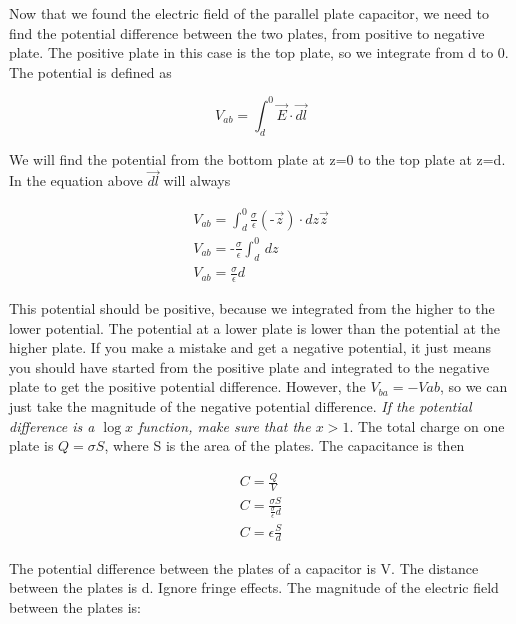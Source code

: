 \documentclass{ximera}
\begin{document}
Now that we found the electric field of the parallel plate capacitor, we need to find the potential difference between the two plates, from positive to negative plate. The positive plate in this case is the top plate, so we integrate from d to 0. The potential is defined as

\begin{equation}
V_{ab}= \int_d^0 \vec{E} \cdot \vec{dl}
\end{equation}


We will find the potential from the bottom plate at z=0 to the top plate at z=d. In the equation above $\vec{dl}$ will always

\begin{eqnarray}
V_{ab}= \int_d^0   \frac{\sigma}{ \epsilon } (\text{-} \vec{z}) \cdot dz \vec{z} \\
V_{ab}= \text{-} \frac{\sigma}{ \epsilon } \int_d^0     \, dz \\
V_{ab}=\frac{\sigma}{ \epsilon } d
\end{eqnarray}

This potential should be positive, because we integrated from the higher to the lower potential. The potential at a lower plate is lower than the potential at the higher plate. If you make a mistake and get a negative potential, it just means you should have started from the positive plate and integrated to the negative plate to get the positive potential difference. However, the $V_{ba}=-V{ab}$, so we can just take the magnitude of the negative potential difference. {\it If the potential difference is a $\log x$ function, make sure that the $x>1$}. The total charge on one plate is $Q=\sigma S$, where S is the area of the plates. The capacitance is then


\begin{eqnarray}
C=\frac{Q}{V} \\
C=\frac{\sigma S}{\frac{\sigma }{ \epsilon } d } \\
C=\epsilon  \frac{S}{d}
\end{eqnarray}


\begin{question}  
The potential difference between the plates of a capacitor is  V. The distance between the plates is d. Ignore fringe effects. The magnitude of the electric field between the plates is:
 
\begin{multipleChoice}  
\end{multipleChoice}  
\end{question} 
\end{document}
